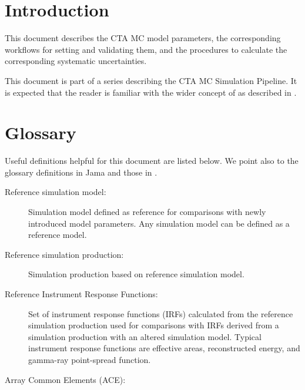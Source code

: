 \section{Introduction}

This document describes the CTA MC model parameters, the corresponding workflows for setting and validating them, and the procedures to calculate the corresponding systematic uncertainties.

This document is part of a series describing the CTA MC Simulation Pipeline. 
It is expected that the reader is familiar with the wider concept of \simsys as described in  \cite{CTAConcept}.


\section{Glossary}

Useful definitions helpful for this document are listed below.
We point also to the glossary definitions in Jama and those in  \cite{CTAConcept}.

\begin{description}

\item[Reference simulation model:] 
Simulation model defined as reference for comparisons with newly introduced model parameters.
Any simulation model can be defined as a reference model.

\item[Reference simulation production: ]
Simulation production based on reference simulation model. 

\item[Reference Instrument Response Functions: ]  
Set of instrument response functions (IRFs) calculated from the reference simulation production used for comparisons with IRFs derived from a simulation production with an altered simulation model.
Typical instrument response functions are effective areas, reconstructed energy, and gamma-ray point-spread function.

\item[Array Common Elements (ACE): ]

\end{description}


